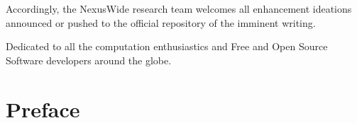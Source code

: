 \documentclass[13pt]{scrarticle}
\newcommand{\name}[1]{\color{red} {\textup{#1}}\color{black}}
\begin{document}
    Accordingly, the \name{NexusWide } research team welcomes all enhancement ideations announced or pushed to the official repository of the imminent writing.
    \newline


    \newpage
    \thispagestyle{empty}



    \begin{centering}
        \vspace*{7cm}
      
        \hspace{1.0cm}
        Dedicated to all the computation enthusiastics \newline
        \hspace*{2.5cm}
        and \newline
        \hspace{0.3cm}
        Free and Open Source Software developers around the globe.

    \end{centering}


    \newpage
    \thispagestyle{fancy}
    \setcounter{page}{4}



    \tableofcontents
    \newline


    \newpage
    \thispagestyle{fancy}
    \setcounter{page}{1}


    \section*{Preface}
\end{document}
